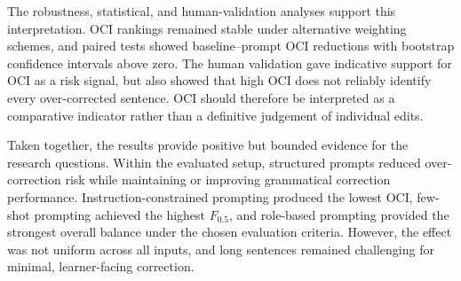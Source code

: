 The robustness, statistical, and human-validation analyses support this interpretation. OCI rankings remained stable under alternative weighting schemes, and paired tests showed baseline--prompt OCI reductions with bootstrap confidence intervals above zero. The human validation gave indicative support for OCI as a risk signal, but also showed that high OCI does not reliably identify every over-corrected sentence. OCI should therefore be interpreted as a comparative indicator rather than a definitive judgement of individual edits.

Taken together, the results provide positive but bounded evidence for the research questions. Within the evaluated setup, structured prompts reduced over-correction risk while maintaining or improving grammatical correction performance. Instruction-constrained prompting produced the lowest OCI, few-shot prompting achieved the highest $F_{0.5}$, and role-based prompting provided the strongest overall balance under the chosen evaluation criteria. However, the effect was not uniform across all inputs, and long sentences remained challenging for minimal, learner-facing correction.
